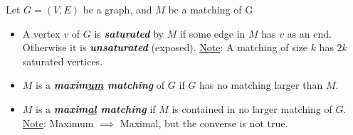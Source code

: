 \begin{defbox}
    \begin{definition}
        Let $ G=(V,E) $ be a graph, and $ M $ be a matching of G
        \begin{itemize}
            \item A vertex $ v $ of $ G $ is \textbf{\emph{saturated}} by $ M $
                  if some edge in $ M $ has $ v $ as an end. Otherwise it is \textbf{\emph{unsaturated}}
                  (exposed). \underline{Note}: A matching of size $ k $ has $ 2k $ saturated vertices.
            \item $ M $ is a \textbf{\emph{maxim\underline{um} matching}} of $ G $ if $ G $ has no matching
                  larger than $ M $.
            \item $ M $ is a \textbf{\emph{maxim\underline{al} matching}} if $ M $ is contained in no larger
                  matching of $ G $. \underline{Note}: Maximum $ \implies $ Maximal, but the converse is not true.
        \end{itemize}

    \end{definition}
\end{defbox}

